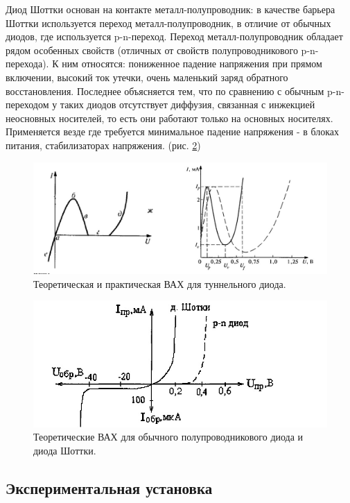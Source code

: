 \documentclass[a4paper, 12pt]{article}
\begin{document}
Диод Шоттки основан на контакте металл-полупроводник: в качестве барьера Шоттки используется переход металл-полупроводник, в отличие от обычных диодов, где используется p-n-переход. Переход металл-полупроводник обладает рядом особенных свойств (отличных от свойств полупроводникового p-n-перехода). К ним относятся: пониженное падение напряжения при прямом включении, высокий ток утечки, очень маленький заряд обратного восстановления. Последнее объясняется тем, что по сравнению с обычным p-n-переходом у таких диодов отсутствует диффузия, связанная с инжекцией неосновных носителей, то есть они работают только на основных носителях. Применяется везде где требуется минимальное падение напряжения - в блоках питания, стабилизаторах напряжения. (рис. \ref{fig:theor_diods})

\begin{figure}[H]
    \centering
    \includegraphics[width=0.7\linewidth]{Theor_diod_1.png}
    \caption{Теоретическая и практическая ВАХ для туннельного диода.}
    \label{fig:theor_diod_0}
\end{figure}

\begin{figure}[H]
    \centering
    \includegraphics[width=0.7\linewidth]{Shottki_theor.jpg}
    \caption{Теоретические ВАХ для обычного полупроводникового диода и диода Шоттки.}
    \label{fig:theor_diods}
\end{figure}


\subsection*{Экспериментальная установка}
\end{document}

